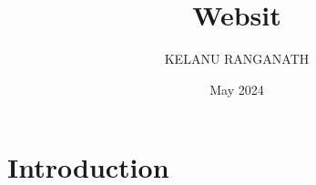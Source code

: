 \documentclass{article}
\title{Websit}
\author{KELANU RANGANATH}
\date{May 2024}
\begin{document}
\maketitle

\section{Introduction}
\end{document}
